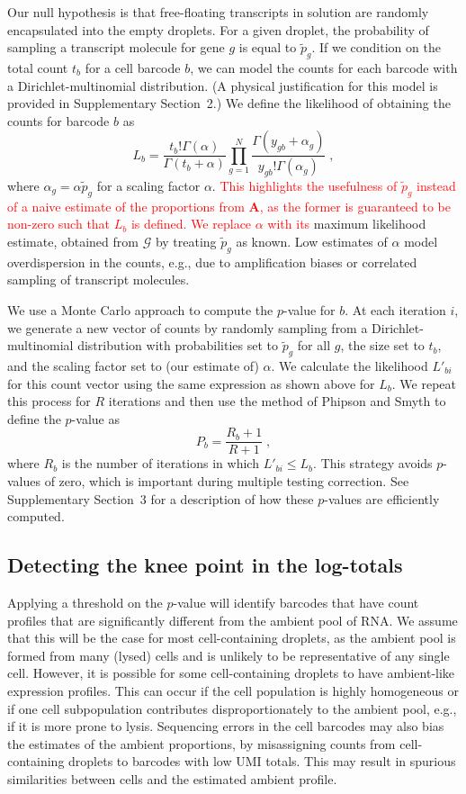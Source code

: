 \documentclass{bmcart}
\newcommand{\revised}[1]{\textcolor{red}{#1}}
\newcommand{\suppsecphysical}{2}
\newcommand{\suppsecmontecarlo}{3}
\begin{document}
Our null hypothesis is that free-floating transcripts in solution are randomly encapsulated into the empty droplets.
For a given droplet, the probability of sampling a transcript molecule for gene $g$ is equal to $\tilde{p}_g$.
If we condition on the total count $t_b$ for a cell barcode $b$, we can model the counts for each barcode with a Dirichlet-multinomial distribution.
(A physical justification for this model is provided in Supplementary Section~\suppsecphysical{}.)
We define the likelihood of obtaining the counts for barcode $b$ as 
\[
    L_b = \frac{t_b!\Gamma(\alpha)}{\Gamma(t_b + \alpha)} \prod_{g=1}^N \frac{\Gamma(y_{gb}+\alpha_g)}{y_{gb}!\Gamma(\alpha_g)} \;,
\]
where $\alpha_g = \alpha\tilde{p}_g$ for a scaling factor $\alpha$.
\revised{This highlights the usefulness of $\tilde p_g$ instead of a naive estimate of the proportions from $\mathbf{A}$, as the former is guaranteed to be non-zero such that $L_b$ is defined.}
\revised{We replace $\alpha$ with its} maximum likelihood estimate, obtained from $\mathcal{G}$ by treating $\tilde{p}_g$ as known.
Low estimates of $\alpha$ model overdispersion in the counts, e.g., due to amplification biases or correlated sampling of transcript molecules.

We use a Monte Carlo approach to compute the $p$-value for $b$.
At each iteration $i$, we generate a new vector of counts by randomly sampling from a Dirichlet-multinomial distribution with probabilities set to $\tilde{p}_g$ for all $g$, the size set to $t_b$, and the scaling factor set to (our estimate of) $\alpha$.
We calculate the likelihood $L'_{bi}$ for this count vector using the same expression as shown above for $L_b$.
We repeat this process for $R$ iterations and then use the method of Phipson and Smyth \cite{phipson2010permutation} to define the $p$-value as 
\[
    P_b = \frac{R_b +1 }{R + 1} \;,
\]
where $R_b$ is the number of iterations in which $L'_{bi} \le L_b$.
This strategy avoids $p$-values of zero, which is important during multiple testing correction.
See Supplementary Section~\suppsecmontecarlo{} for a description of how these $p$-values are efficiently computed.

\subsection*{Detecting the knee point in the log-totals}
Applying a threshold on the $p$-value will identify barcodes that have count profiles that are significantly different from the ambient pool of RNA.
We assume that this will be the case for most cell-containing droplets, as the ambient pool is formed from many (lysed) cells and is unlikely to be representative of any single cell.
However, it is possible for some cell-containing droplets to have ambient-like expression profiles.
This can occur if the cell population is highly homogeneous or if one cell subpopulation contributes disproportionately to the ambient pool, e.g., if it is more prone to lysis.
Sequencing errors in the cell barcodes may also bias the estimates of the ambient proportions, by misassigning counts from cell-containing droplets to barcodes with low UMI totals.
This may result in spurious similarities between cells and the estimated ambient profile.
\end{document}
